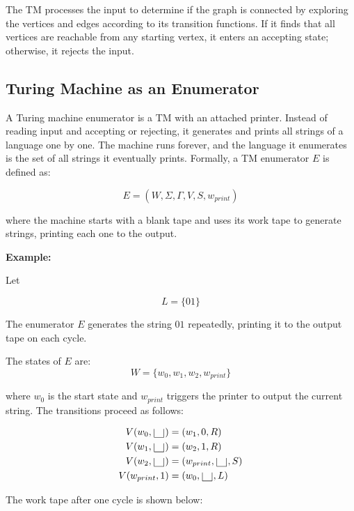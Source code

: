 \documentclass[12pt,a4paper,openany]{article}
\begin{document}
The TM processes the input to determine if the graph is connected by exploring
the vertices and edges according to its transition functions.
If it finds that all vertices are reachable from any starting vertex, it enters
an accepting state; otherwise, it rejects the input.

\subsection{Turing Machine as an Enumerator}

A Turing machine enumerator is a TM with an attached printer. Instead of
reading input and accepting or rejecting, it generates and prints all strings
of a language one by one. The machine runs forever, and the language it
enumerates is the set of all strings it eventually prints. Formally, a TM enumerator $E$ is defined as:

\[
E = (W, \Sigma, \Gamma, V, S, w_{print})
\]

where the machine starts with a blank tape and uses its work tape to generate
strings, printing each one to the output.

\textbf{Example:}

Let

\[
L = \{ 01 \}
\]

The enumerator $E$ generates the string $01$ repeatedly, printing it to the
output tape on each cycle.

The states of $E$ are:
\[
W = \{w_0, w_1, w_2, w_{print}\}
\]

where $w_0$ is the start state and $w_{print}$ triggers the printer to output
the current string. The transitions proceed as follows:

\[
\begin{aligned}
V(w_0, \scalebox{2.5}{\textvisiblespace}) &= (w_1, 0, R) \\
V(w_1, \scalebox{2.5}{\textvisiblespace}) &= (w_2, 1, R) \\
V(w_2, \scalebox{2.5}{\textvisiblespace}) &= (w_{print}, \scalebox{2.5}{\textvisiblespace}, S) \\
V(w_{print}, 1) &= (w_0, \scalebox{2.5}{\textvisiblespace}, L)
\end{aligned}
\]

The work tape after one cycle is shown below:

\begin{center}
\end{center}
\end{document}
